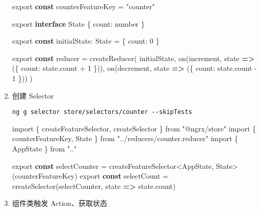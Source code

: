 \documentclass[
]{article}
\newenvironment{Shaded}{}{}
\newcommand{\AttributeTok}[1]{\textcolor[rgb]{0.49,0.56,0.16}{#1}}
\newcommand{\DataTypeTok}[1]{\textcolor[rgb]{0.56,0.13,0.00}{#1}}
\newcommand{\DecValTok}[1]{\textcolor[rgb]{0.25,0.63,0.44}{#1}}
\newcommand{\FunctionTok}[1]{\textcolor[rgb]{0.02,0.16,0.49}{#1}}
\newcommand{\ImportTok}[1]{#1}
\newcommand{\KeywordTok}[1]{\textcolor[rgb]{0.00,0.44,0.13}{\textbf{#1}}}
\newcommand{\NormalTok}[1]{#1}
\newcommand{\OperatorTok}[1]{\textcolor[rgb]{0.40,0.40,0.40}{#1}}
\newcommand{\StringTok}[1]{\textcolor[rgb]{0.25,0.44,0.63}{#1}}
\begin{document}
\begin{enumerate}
\begin{Shaded}
\begin{Highlighting}[]
\ImportTok{export} \KeywordTok{const}\NormalTok{ counterFeatureKey }\OperatorTok{=} \StringTok{"counter"}

\ImportTok{export} \KeywordTok{interface}\NormalTok{ State \{}
  \DataTypeTok{count}\OperatorTok{:}\NormalTok{ number}
\NormalTok{\}}

\ImportTok{export} \KeywordTok{const}\NormalTok{ initialState}\OperatorTok{:}\NormalTok{ State }\OperatorTok{=}\NormalTok{ \{}
  \DataTypeTok{count}\OperatorTok{:} \DecValTok{0}
\NormalTok{\}}

\ImportTok{export} \KeywordTok{const}\NormalTok{ reducer }\OperatorTok{=} \FunctionTok{createReducer}\NormalTok{(}
\NormalTok{  initialState}\OperatorTok{,}
  \FunctionTok{on}\NormalTok{(increment}\OperatorTok{,}\NormalTok{ state }\KeywordTok{=\textgreater{}}\NormalTok{ (\{ }\DataTypeTok{count}\OperatorTok{:}\NormalTok{ state}\OperatorTok{.}\AttributeTok{count} \OperatorTok{+} \DecValTok{1}\NormalTok{ \}))}\OperatorTok{,}
  \FunctionTok{on}\NormalTok{(decrement}\OperatorTok{,}\NormalTok{ state }\KeywordTok{=\textgreater{}}\NormalTok{ (\{ }\DataTypeTok{count}\OperatorTok{:}\NormalTok{ state}\OperatorTok{.}\AttributeTok{count} \OperatorTok{{-}} \DecValTok{1}\NormalTok{ \}))}
\NormalTok{)}
\end{Highlighting}
\end{Shaded}
\item
  创建 Selector

  \texttt{ng\ g\ selector\ store/selectors/counter\ -\/-skipTests}

\begin{Shaded}
\begin{Highlighting}[]
\ImportTok{import}\NormalTok{ \{ createFeatureSelector}\OperatorTok{,}\NormalTok{ createSelector \} }\ImportTok{from} \StringTok{"@ngrx/store"}
\ImportTok{import}\NormalTok{ \{ counterFeatureKey}\OperatorTok{,}\NormalTok{ State \} }\ImportTok{from} \StringTok{"../reducers/counter.reducer"}
\ImportTok{import}\NormalTok{ \{ AppState \} }\ImportTok{from} \StringTok{".."}

\ImportTok{export} \KeywordTok{const}\NormalTok{ selectCounter }\OperatorTok{=}\NormalTok{ createFeatureSelector}\OperatorTok{\textless{}}\NormalTok{AppState}\OperatorTok{,}\NormalTok{ State}\OperatorTok{\textgreater{}}\NormalTok{(counterFeatureKey)}
\ImportTok{export} \KeywordTok{const}\NormalTok{ selectCount }\OperatorTok{=} \FunctionTok{createSelector}\NormalTok{(selectCounter}\OperatorTok{,}\NormalTok{ state }\KeywordTok{=\textgreater{}}\NormalTok{ state}\OperatorTok{.}\AttributeTok{count}\NormalTok{)}
\end{Highlighting}
\end{Shaded}
\item
  组件类触发 Action、获取状态


\end{enumerate}
\end{document}
